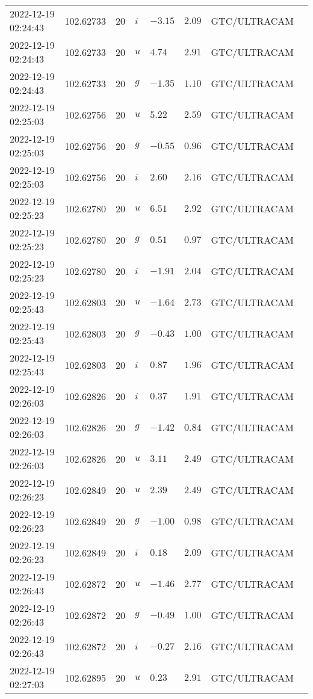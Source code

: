 \documentclass{nature_plusfigure}
\begin{document}
\begin{supplement}
\begin{center}
\begin{longtable}{llllllll}
2022-12-19 02:24:43 & 102.62733 & 20 & $i$ & $-3.15$ & $2.09$ & GTC/ULTRACAM &  \\ 
2022-12-19 02:24:43 & 102.62733 & 20 & $u$ & $4.74$ & $2.91$ & GTC/ULTRACAM &  \\ 
2022-12-19 02:24:43 & 102.62733 & 20 & $g$ & $-1.35$ & $1.10$ & GTC/ULTRACAM &  \\ 
2022-12-19 02:25:03 & 102.62756 & 20 & $u$ & $5.22$ & $2.59$ & GTC/ULTRACAM &  \\ 
2022-12-19 02:25:03 & 102.62756 & 20 & $g$ & $-0.55$ & $0.96$ & GTC/ULTRACAM &  \\ 
2022-12-19 02:25:03 & 102.62756 & 20 & $i$ & $2.60$ & $2.16$ & GTC/ULTRACAM &  \\ 
2022-12-19 02:25:23 & 102.62780 & 20 & $u$ & $6.51$ & $2.92$ & GTC/ULTRACAM &  \\ 
2022-12-19 02:25:23 & 102.62780 & 20 & $g$ & $0.51$ & $0.97$ & GTC/ULTRACAM &  \\ 
2022-12-19 02:25:23 & 102.62780 & 20 & $i$ & $-1.91$ & $2.04$ & GTC/ULTRACAM &  \\ 
2022-12-19 02:25:43 & 102.62803 & 20 & $u$ & $-1.64$ & $2.73$ & GTC/ULTRACAM &  \\ 
2022-12-19 02:25:43 & 102.62803 & 20 & $g$ & $-0.43$ & $1.00$ & GTC/ULTRACAM &  \\ 
2022-12-19 02:25:43 & 102.62803 & 20 & $i$ & $0.87$ & $1.96$ & GTC/ULTRACAM &  \\ 
2022-12-19 02:26:03 & 102.62826 & 20 & $i$ & $0.37$ & $1.91$ & GTC/ULTRACAM &  \\ 
2022-12-19 02:26:03 & 102.62826 & 20 & $g$ & $-1.42$ & $0.84$ & GTC/ULTRACAM &  \\ 
2022-12-19 02:26:03 & 102.62826 & 20 & $u$ & $3.11$ & $2.49$ & GTC/ULTRACAM &  \\ 
2022-12-19 02:26:23 & 102.62849 & 20 & $u$ & $2.39$ & $2.49$ & GTC/ULTRACAM &  \\ 
2022-12-19 02:26:23 & 102.62849 & 20 & $g$ & $-1.00$ & $0.98$ & GTC/ULTRACAM &  \\ 
2022-12-19 02:26:23 & 102.62849 & 20 & $i$ & $0.18$ & $2.09$ & GTC/ULTRACAM &  \\ 
2022-12-19 02:26:43 & 102.62872 & 20 & $u$ & $-1.46$ & $2.77$ & GTC/ULTRACAM &  \\ 
2022-12-19 02:26:43 & 102.62872 & 20 & $g$ & $-0.49$ & $1.00$ & GTC/ULTRACAM &  \\ 
2022-12-19 02:26:43 & 102.62872 & 20 & $i$ & $-0.27$ & $2.16$ & GTC/ULTRACAM &  \\ 
2022-12-19 02:27:03 & 102.62895 & 20 & $u$ & $0.23$ & $2.91$ & GTC/ULTRACAM &  \\ 

\end{longtable}
\end{center}
\end{supplement}
\end{document}
